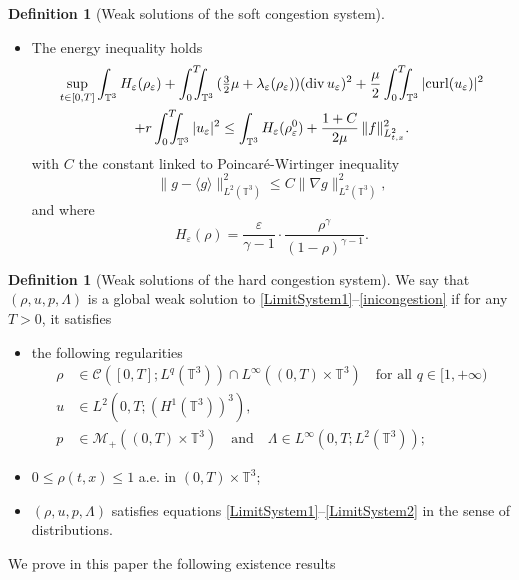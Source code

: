 \documentclass[JEP,XML,SOM,Unicode,NoEqCountersInSection]{cedram}
\let\mathcal\mathscr
\newcommand{\<}{\bigl\langle}
\renewcommand{\>}{\bigr\rangle}
\newcommand{\intTTT}{\int_0^T\hspace*{-2.5mm}\int_{\TT}}
\newcommand{\labeleq}[1]{}
\theoremstyle{definition}
\newtheorem{definition}[thm]{Definition}
\theoremstyle{remark}
\newcommand{\TT}{\mathbb{T}^3}
\DeclareMathOperator{\curl}{curl}
\DeclareMathOperator{\Div}{div}
\let\ep\varepsilon
\begin{document}
\begin{definition}[Weak solutions of the soft congestion system]
\begin{itemize}
\item The energy inequality holds
\begin{multline*}\labeleq{energy_ep-0}
\sup_{t\in[0,T]} \int_{\TT} H_{\ep}(\rho_{\ep})
+ \intTTT{(\tfrac{3}{2}\mu+\lambda_{\ep}(\rho_{\ep}))(\Div u_{\ep})^2 } + \frac{\mu}{2} \intTTT{ |{\curl (u_{\ep})}|^2}\\
+ r \intTTT{ |u_{\ep}|^2}
\leq \int_{\TT}{H_{\ep}(\rho_\ep^0)} + \frac{1+C}{2\mu}\, \|f\|^2_{L^2_{t,x}}.
\end{multline*}
with $C$ the constant linked to Poincaré-Wirtinger inequality
$$\|g - \<g\>\|^2_{L^2(\TT)} \le C \|\nabla g \|^2_{L^2(\TT)}, $$
and where
\begin{equation*}\labeleq{H_ep}
H_{\ep}(\rho) = \dfrac{\ep}{\gamma-1}\cdot \dfrac{\rho^{\gamma}}{(1-\rho)^{\gamma-1}}.
\end{equation*} 
\end{itemize}
\end{definition}

\begin{definition}[Weak solutions of the hard congestion system]
We say that $(\rho,u,p,\Lambda)$ is a global weak solution to \eqref{LimitSystem1}--\eqref{inicongestion} if for any $T > 0$, it satisfies
\begin{itemize}
\item the following regularities
\begin{align*}
\rho &\in \mathcal{C}([0,T];L^q(\TT)) \cap L^\infty((0,T) \times \TT)\quad \text{for all } q \in [1, +\infty)\\
u &\in L^2(0,T;(H^1(\TT))^3),\\
p &\in \mathcal{M}_+((0,T)\times \TT) \quad \text{and} \quad \Lambda \in L^\infty(0,T;L^2(\TT));
\end{align*}
\item $0 \leq \rho(t,x) \leq 1$ a.e. in $(0,T)\times \TT$;
\item $(\rho,u,p,\Lambda)$ satisfies equations \eqref{LimitSystem1}--\eqref{LimitSystem2} in the sense of distributions.
\end{itemize}
\end{definition}

We prove in this paper the following existence results
\end{document}
